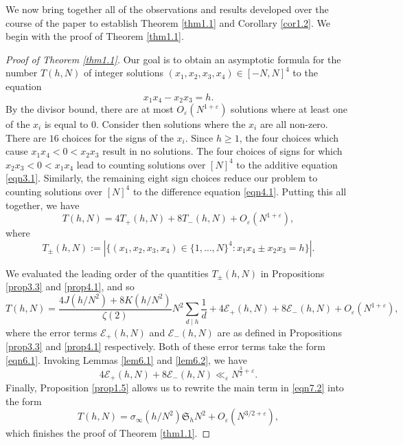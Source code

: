 \documentclass[12pt,reqno]{amsart}
\theoremstyle{definition}
\theoremstyle{remark}
\numberwithin{equation}{section}
\def\eps{\varepsilon}
\def \cE {\mathcal E}
\newcommand\1{\mathds{1}}
\begin{document}
We now bring together all of the observations and results developed over the course of the paper to establish Theorem \ref{thm1.1} and Corollary \ref{cor1.2}. We begin with the proof of Theorem \ref{thm1.1}.

\begin{proof}[Proof of Theorem \ref{thm1.1}]
    Our goal is to obtain an asymptotic formula for the number $T(h,N)$ of integer solutions $(x_1,x_2,x_3,x_4)\in[-N,N]^4$ to the equation
    \begin{equation*}
        x_1x_4 - x_2x_3 = h.
    \end{equation*}
    By the divisor bound, there are at most $O_\eps(N^{1+\eps})$ solutions where at least one of the $x_i$ is equal to $0$. Consider then solutions where the $x_i$ are all non-zero. There are $16$ choices for the signs of the $x_i$. Since $h\geqslant 1$, the four choices which cause $x_1x_4 < 0<x_2x_3$ result in no solutions. The four choices of signs for which $x_2x_3<0<x_1x_4$ lead to counting solutions over $[N]^4$ to the additive equation \eqref{eqn3.1}. Similarly, the remaining eight sign choices reduce our problem to counting solutions over $[N]^4$ to the difference equation \eqref{eqn4.1}. Putting this all together, we have
    \begin{equation} \label{eqn7.1}
        T(h,N) = 4T_+(h,N) + 8T_-(h,N) + O_\eps(N^{1+\eps}),
    \end{equation}
    where
    \begin{equation*}
        T_\pm(h,N):=|\{ (x_1,x_2,x_3,x_4) \in \{1,\ldots,N\}^4 : x_1x_4\pm x_2x_3 =h\}|.
    \end{equation*}

    We evaluated the leading order of the quantities $T_\pm(h,N)$ in Propositions \ref{prop3.3} and \ref{prop4.1}, and so
    \begin{equation}\label{eqn7.2}
        T(h,N) = \frac{4J(h/N^2) + 8K(h/N^2)}{\zeta(2)}N^2 \sum_{d\mid h}\frac{1}{d} + 4\cE_+(h,N) + 8\cE_-(h,N) + O_\eps(N^{1+\eps}),
    \end{equation}
    where the error terms $\cE_+(h,N)$ and $\cE_-(h,N)$ are as defined in Propositions \ref{prop3.3} and \ref{prop4.1} respectively. Both of these error terms take the form \eqref{eqn6.1}. Invoking Lemmas \ref{lem6.1} and \ref{lem6.2}, we have
    \begin{equation*}
        4\cE_+(h,N) + 8\cE_-(h,N) \ll_\eps N^{\frac{3}{2} +\eps}.
    \end{equation*}
    Finally, Proposition \ref{prop1.5} allows us to rewrite the main term in \eqref{eqn7.2} into the form
    \begin{equation*}
        T(h,N) = \sigma_{\infty}(h/N^2) \mathfrak{S}_h N^2 + O_{\eps}(N^{3/2 + \eps}),
    \end{equation*}
    which finishes the proof of Theorem \ref{thm1.1}.
\end{proof}
\end{document}
